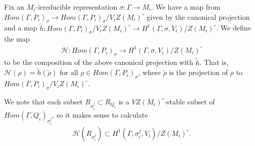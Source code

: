 Fix an $M_i$-irreducible representation $\sigma: \Gamma \rightarrow M_i$. We have a map from $Hom(\Gamma, P_i)_\sigma \rightarrow Hom(\Gamma, P_i)_\sigma / V_i Z(M_i)^\circ$ given by the canonical projection and a map $\tilde{h}: Hom(\Gamma, P_i)_\sigma / V_i Z(M_i)^\circ \rightarrow H^1(\Gamma, \sigma, V_i)/Z(M_i)^\circ$. We define the map
\begin{eqnarray*}
  \mathcal{H}: Hom(\Gamma, P_i)_\sigma \rightarrow H^1(\Gamma, \sigma, V_i) / Z(M_i)^\circ
\end{eqnarray*}
to be the composition of the above canonical projection with $\tilde{h}$. That is, $\mathcal{H}(\rho) = \tilde{h}(\tilde{\rho})$ for all $\rho \in Hom(\Gamma, P_i)_\sigma$, where $\tilde{\rho}$ is the projection of $\rho$ to $Hom(\Gamma, P_i)_\sigma / V_i Z(M_i)^\circ$.

We note that each subset $R_{\sigma_i^j} \subset R_{Q_i}$ is a $VZ(M_i)^\circ$-stable subset of $Hom(\Gamma, Q_i)_{\sigma_i^j}$, so it makes sense to calculate
\begin{eqnarray*}
  \mathcal{H}(R_{\sigma_i^j}) \subset H^1(\Gamma, \sigma_i^j, V_i) / Z(M_i)^\circ.
\end{eqnarray*}

